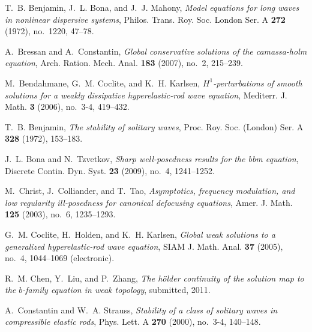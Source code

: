 \documentclass[final,noinfo]{thesis}
\begin{document}
\mainmatter


\renewcommand{\bibname}{REFERENCES}
\backmatter              %
\begin{thebibliography}{100}
    \setlength{\itemsep}{0.2in}
    \normalsize
\providecommand{\bysame}{\leavevmode\hbox to3em{\hrulefill}\thinspace}
    \singlespace
{}
T.~B. Benjamin, J.~L. Bona, and J.~J. Mahony, \emph{Model equations for long
  waves in nonlinear dispersive systems}, Philos. Trans. Roy. Soc. London Ser.
  A \textbf{272} (1972), no.~1220, 47--78.

A.~Bressan and A.~Constantin, \emph{Global conservative solutions of the
  camassa-holm equation}, Arch. Ration. Mech. Anal. \textbf{183} (2007), no.~2,
  215--239.

M.~Bendahmane, G.~M. Coclite, and K.~H. Karlsen,
  \emph{$H^1$-perturbations of smooth solutions for a weakly dissipative
  hyperelastic-rod wave equation}, Mediterr. J. Math. \textbf{3} (2006),
  no.~3-4, 419--432.

T.~B. Benjamin, \emph{The stability of solitary waves}, Proc. Roy. Soc.
  (London) Ser. A \textbf{328} (1972), 153--183.

J.~L. Bona and N.~Tzvetkov, \emph{Sharp well-posedness results for the bbm
  equation}, Discrete Contin. Dyn. Syst. \textbf{23} (2009), no.~4, 1241--1252.

M.~Christ, J.~Colliander, and T.~Tao, \emph{Asymptotics, frequency modulation,
  and low regularity ill-posedness for canonical defocusing equations}, Amer.
  J. Math. \textbf{125} (2003), no.~6, 1235--1293.

G.~M. Coclite, H.~Holden, and K.~H. Karlsen, \emph{Global weak solutions to a
  generalized hyperelastic-rod wave equation}, SIAM J. Math. Anal. \textbf{37}
  (2005), no.~4, 1044--1069 (electronic).

R.~M. Chen, Y.~Liu, and P.~Zhang, \emph{The h\"{o}lder continuity of the
  solution map to the $b$-family equation in weak topology}, submitted, 2011.

A.~Constantin and W.~A. Strauss, \emph{Stability of a class of solitary waves
  in compressible elastic rods}, Phys. Lett. A \textbf{270} (2000), no.~3-4,
  140--148.


\end{thebibliography}
\end{document}
